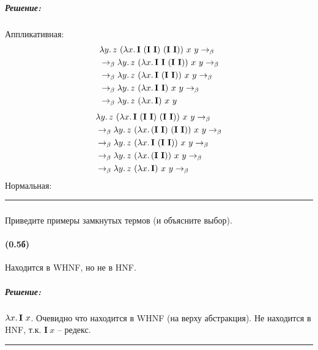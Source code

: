\documentclass{article}
\newenvironment{proof}{\subparagraph{\hspace{-1em}Решение:\newline}\-}{\par\noindent\rule{\textwidth}{0.4pt}}
\newcommand{\comb}[1]{\mathbf{#1}}
\newcommand{\betastep}{\rightarrow_\beta}
\begin{document}
    \begin{proof}
        Аппликативная:
        \begin{align}
            & \lambda y\ldotp z~(\lambda x\ldotp \comb{I}~(\comb{I}~\comb{I})~(\comb{I}~\comb{I}))~x~y \betastep \\
            & \betastep \lambda y\ldotp z~(\lambda x\ldotp \comb{I}~\comb{I}~(\comb{I}~\comb{I}))~x~y \betastep \\
            & \betastep \lambda y\ldotp z~(\lambda x\ldotp \comb{I}~(\comb{I}~\comb{I}))~x~y \betastep \\
            & \betastep \lambda y\ldotp z~(\lambda x\ldotp \comb{I}~\comb{I})~x~y \betastep \\
            & \betastep \lambda y\ldotp z~(\lambda x\ldotp \comb{I})~x~y
        \end{align}
        \begin{align}
            & \lambda y\ldotp z~(\lambda x\ldotp \comb{I}~(\comb{I}~\comb{I})~(\comb{I}~\comb{I}))~x~y \betastep \\
            & \betastep \lambda y\ldotp z~(\lambda x\ldotp (\comb{I}~\comb{I})~(\comb{I}~\comb{I}))~x~y \betastep \\
            & \betastep \lambda y\ldotp z~(\lambda x\ldotp \comb{I}~(\comb{I}~\comb{I}))~x~y \betastep \\
            & \betastep \lambda y\ldotp z~(\lambda x\ldotp (\comb{I}~\comb{I}))~x~y \betastep \\
            & \betastep \lambda y\ldotp z~(\lambda x\ldotp \comb{I})~x~y \betastep \\
        \end{align}
        Нормальная:
    \end{proof}

    \subsubsection{}

    Приведите примеры замкнутых термов (и объясните выбор).

    \paragraph{(0.5б)}

    Находится в WHNF, но не в HNF.

    \begin{proof}
        \(\lambda x\ldotp \comb{I}~x\). Очевидно что находится в WHNF (на верху абстракция). Не находится в HNF, т.к. \(\comb{I}~x\) -- редекс.
    \end{proof}
\end{document}
